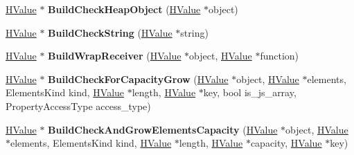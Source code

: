 \begin{DoxyCompactItemize}
\item 
\hyperlink{classv8_1_1internal_1_1_h_value}{H\+Value} $\ast$ {\bfseries Build\+Check\+Heap\+Object} (\hyperlink{classv8_1_1internal_1_1_h_value}{H\+Value} $\ast$object)\hypertarget{classv8_1_1internal_1_1_h_graph_builder_a15cf43bf23ceecd5691159b05e6cbfab}{}\label{classv8_1_1internal_1_1_h_graph_builder_a15cf43bf23ceecd5691159b05e6cbfab}

\item 
\hyperlink{classv8_1_1internal_1_1_h_value}{H\+Value} $\ast$ {\bfseries Build\+Check\+String} (\hyperlink{classv8_1_1internal_1_1_h_value}{H\+Value} $\ast$string)\hypertarget{classv8_1_1internal_1_1_h_graph_builder_adf7d79b7d2ff42123208a4397690c27b}{}\label{classv8_1_1internal_1_1_h_graph_builder_adf7d79b7d2ff42123208a4397690c27b}

\item 
\hyperlink{classv8_1_1internal_1_1_h_value}{H\+Value} $\ast$ {\bfseries Build\+Wrap\+Receiver} (\hyperlink{classv8_1_1internal_1_1_h_value}{H\+Value} $\ast$object, \hyperlink{classv8_1_1internal_1_1_h_value}{H\+Value} $\ast$function)\hypertarget{classv8_1_1internal_1_1_h_graph_builder_aff9e094d9b835c137651097bbe66de8f}{}\label{classv8_1_1internal_1_1_h_graph_builder_aff9e094d9b835c137651097bbe66de8f}

\item 
\hyperlink{classv8_1_1internal_1_1_h_value}{H\+Value} $\ast$ {\bfseries Build\+Check\+For\+Capacity\+Grow} (\hyperlink{classv8_1_1internal_1_1_h_value}{H\+Value} $\ast$object, \hyperlink{classv8_1_1internal_1_1_h_value}{H\+Value} $\ast$elements, Elements\+Kind kind, \hyperlink{classv8_1_1internal_1_1_h_value}{H\+Value} $\ast$length, \hyperlink{classv8_1_1internal_1_1_h_value}{H\+Value} $\ast$key, bool is\+\_\+js\+\_\+array, Property\+Access\+Type access\+\_\+type)\hypertarget{classv8_1_1internal_1_1_h_graph_builder_a7f03525a4e9463b96d8228ea366b336f}{}\label{classv8_1_1internal_1_1_h_graph_builder_a7f03525a4e9463b96d8228ea366b336f}

\item 
\hyperlink{classv8_1_1internal_1_1_h_value}{H\+Value} $\ast$ {\bfseries Build\+Check\+And\+Grow\+Elements\+Capacity} (\hyperlink{classv8_1_1internal_1_1_h_value}{H\+Value} $\ast$object, \hyperlink{classv8_1_1internal_1_1_h_value}{H\+Value} $\ast$elements, Elements\+Kind kind, \hyperlink{classv8_1_1internal_1_1_h_value}{H\+Value} $\ast$length, \hyperlink{classv8_1_1internal_1_1_h_value}{H\+Value} $\ast$capacity, \hyperlink{classv8_1_1internal_1_1_h_value}{H\+Value} $\ast$key)\hypertarget{classv8_1_1internal_1_1_h_graph_builder_abfc8876fa722e0bfe31559894ded0a40}{}\label{classv8_1_1internal_1_1_h_graph_builder_abfc8876fa722e0bfe31559894ded0a40}


\end{DoxyCompactItemize}
